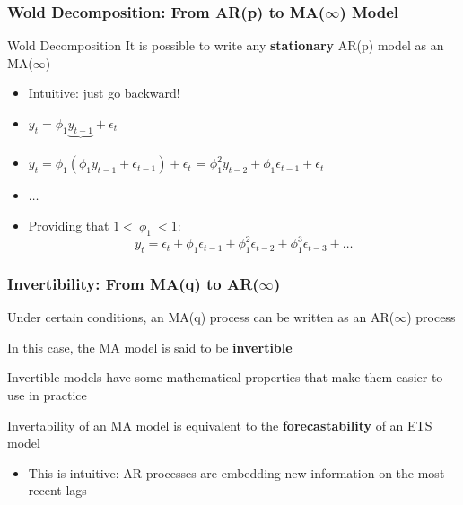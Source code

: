 \documentclass{beamer}
\newenvironment{wideitemize}{\itemize\addtolength{\itemsep}{10pt}}{\enditemize}
\begin{document}
\begin{frame}
  \frametitle{Wold Decomposition: From AR(p) to MA($\infty$) Model}

  \begin{block}{Wold Decomposition}
    It is possible to write any \textbf{stationary} AR(p) model as an MA($\infty$)
  \end{block}

  \begin{itemize}
  \item Intuitive: just go backward!
  \item $y_t = \phi_1 \underbrace{y_{t-1}}_{} + \epsilon_t$
  \item $y_t = \phi_1 (\phi_1 y_{t-1} + \epsilon_{t-1}) + \epsilon_t$ = $\phi_1^2 y_{t-2} + \phi_1\epsilon_{t-1} + \epsilon_t$
  \item $\dots$
  \item Providing that $1 < \ \phi_1 \ < 1$:
    \begin{equation*}
      y_t = \epsilon_t + \phi_1 \epsilon_{t-1} + \phi_1^2 \epsilon_{t-2} + \phi_1^3 \epsilon_{t-3} + \dots
    \end{equation*}
  \end{itemize}  
\end{frame}


\begin{frame}
  \frametitle{Invertibility: From MA(q) to AR($\infty$)}

  \begin{wideitemize}
    \item Under certain conditions, an MA(q) process can be written as an AR($\infty$) process
    \item In this case, the MA model is said to be \textbf{invertible}
    \item Invertible models have some mathematical properties that make them easier to use in practice
    \item Invertability of an MA model is equivalent to the \textbf{forecastability} of an ETS model
      \begin{itemize}
      \item This is intuitive: AR processes are embedding new information on the most recent lags 
      \end{itemize}
  \end{wideitemize}
  
\end{frame}
\end{document}
